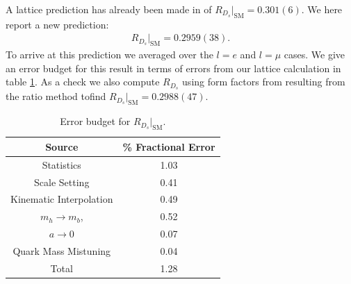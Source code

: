 A lattice prediction has already been made in \cite{Monahan:2017uby} of $R_{D_s}|_{\text{SM}} = 0.301(6)$. We here report a new prediction:
\begin{align}
  R_{D_s}|_{\text{SM}} = 0.2959(38).
  \label{eq:RDs}
\end{align}
To arrive at this prediction we averaged over the $l=e$ and $l=\mu$ cases. We give an error budget for this result in terms of errors from our lattice calculation in table \ref{RDs_budget}. As a check we also compute $R_{D_s}$ using form factors from resulting from the ratio method tofind $R_{D_s}|_{\text{SM}} = 0.2988(47)$.

\begin{table}[htb!]
  \begin{center}
    \begin{tabular}{c c}
      \hline
      Source & \% Fractional Error \\ [0.5ex]
      \hline
      Statistics & 1.03  \\ [1ex]
      Scale Setting & 0.41  \\ [1ex]
      Kinematic Interpolation & 0.49  \\ [1ex]
      $m_h \to m_b$, & 0.52  \\ [1ex]
      $a\to 0$ & 0.07  \\ [1ex]
      Quark Mass Mistuning & 0.04 \\ [1ex]
      \hline
      Total & 1.28 \\ [1ex]
      \hline
    \end{tabular}
  \end{center}
  \caption{Error budget for $R_{D_s}|_{\text{SM}}$.\label{RDs_budget}}
\end{table}




